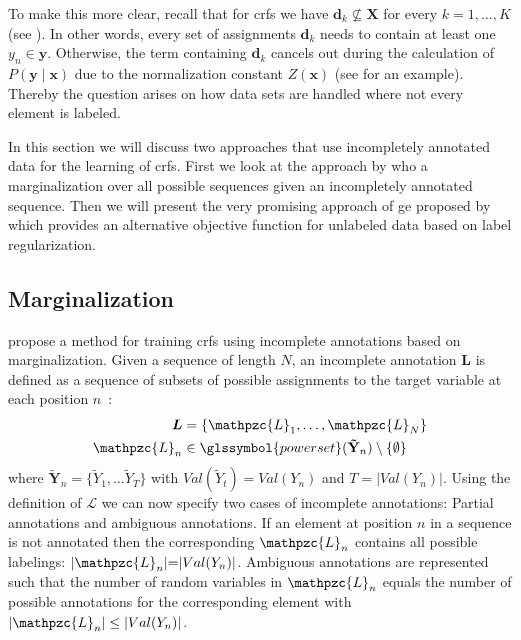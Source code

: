 To make this more clear, recall that for \glspl{crf} we have $\mathbf{d}_k\not\subseteq\mathbf{X}$ for every $k=1,\dots,K$ (see ).
In other words, every set of assignments $\mathbf{d}_k$ needs to contain at least one $y_n\in\mathbf{y}$.
Otherwise, the term containing $\mathbf{d}_k$ cancels out during the calculation of $P(\mathbf{y}\mid\mathbf{x})$ due to the normalization constant $Z(\mathbf{x})$ (see  for an example).
Thereby the question arises on how data sets are handled where not every element is labeled.

In this section we will discuss two approaches that use incompletely annotated data for the learning of \glspl{crf}.
First we look at the approach by \citet{tsuboi2008training} who a marginalization over all possible sequences given an incompletely annotated sequence.
Then we will present the very promising approach of \acrfull{ge} proposed by \citet{mann2007simple} which provides an alternative \gls{objective function} for unlabeled data based on \gls{label regularization}.

\subsection{Marginalization}

\citet{tsuboi2008training} propose a method for training \glspl{crf} using incomplete annotations based on marginalization.
Given a sequence of length $N$, an incomplete annotation $\bm{L}$ is defined as a sequence of subsets of possible assignments to the \gls{target variable} at each position $n$~\citep{tsuboi2008training}:
\begin{equation}
  \label{equ:incomplete-annotation}
  \begin{split}
    \bm{L}&= \left\{\mathpzc{L}_1,\dots,\mathpzc{L}_N\right\}\\
    \mathpzc{L}_n&\in\glssymbol{power set}(\mathbf{\tilde{Y}}_n)\setminus \{\emptyset\}
  \end{split}
\end{equation}
where $\mathbf{\tilde{Y}}_n{=}\{\tilde{Y}_1,\dots\tilde{Y}_T\}$ with $Val(\tilde{Y}_t){=}Val(Y_n)$ and $T{=}|Val(Y_n)|$.
Using the definition of $\mathcal{L}$ we can now specify two cases of incomplete annotations: Partial annotations and ambiguous annotations.
If an element at position $n$ in a sequence is not annotated then the corresponding $\mathpzc{L}_n$ contains all possible labelings: $|\mathpzc{L}_n|{=}|Val(Y_n)|$.
Ambiguous annotations are represented such that the number of \glspl{random variable} in $\mathpzc{L}_n$ equals the number of possible annotations for the corresponding element with $|\mathpzc{L}_n|\leq |Val(Y_n)|$.


